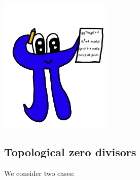 \documentclass[a4paper]{article}
\begin{document}
\makeexheadereng

\begin{center}
    \includegraphics*[width=0.4\textwidth]{pi.png}
\end{center}


\setcounter{subsection}{8}
\subsection{Topological zero divisors}

We consider two cases:
\end{document}
